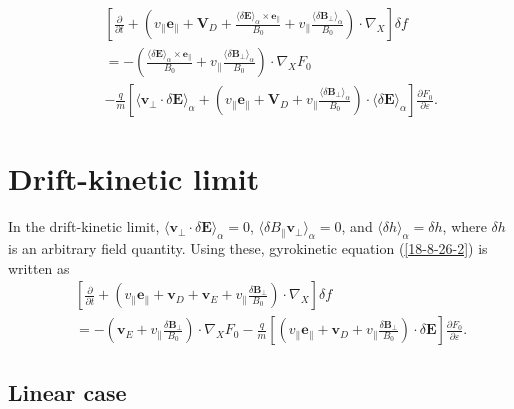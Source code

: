\documentclass{llncs}
\begin{document}
\begin{eqnarray}
  &  & \left[ \frac{\partial}{\partial t} + \left( v_{\parallel}
  \mathbf{e}_{\parallel} +\mathbf{V}_D + \frac{ \langle \delta \mathbf{E}
  \rangle_{\alpha} \times \mathbf{e}_{\parallel}}{B_0} + v_{\parallel}
  \frac{\langle \delta \mathbf{B}_{\perp} \rangle_{\alpha}}{B_0} \right) \cdot
  \nabla_X \right] \delta f \nonumber\\
  &  & = - \left( \frac{ \langle \delta \mathbf{E} \rangle_{\alpha} \times
  \mathbf{e}_{\parallel}}{B_0} + v_{\parallel} \frac{\langle \delta
  \mathbf{B}_{\perp} \rangle_{\alpha}}{B_0} \right) \cdot \nabla_X F_0
  \nonumber\\
  &  & - \frac{q}{m} \left[ \langle \mathbf{v}_{\perp} \cdot \delta
  \mathbf{E} \rangle_{\alpha} + \left( v_{\parallel} \mathbf{e}_{\parallel}
  +\mathbf{V}_D + v_{\parallel} \frac{\langle \delta \mathbf{B}_{\perp}
  \rangle_{\alpha}}{B_0} \right) \cdot \langle \delta \mathbf{E}
  \rangle_{\alpha} \right] \frac{\partial F_0}{\partial \varepsilon} . 
  \label{18-8-26-2}
\end{eqnarray}


\section{Drift-kinetic limit}

In the drift-kinetic limit, $\langle \mathbf{v}_{\perp} \cdot \delta
\mathbf{E} \rangle_{\alpha} = 0$, $\langle \delta B_{\parallel}
\mathbf{v}_{\perp} \rangle_{\alpha} = 0$, and $\langle \delta h
\rangle_{\alpha} = \delta h$, where $\delta h$ is an arbitrary field quantity.
Using these, gyrokinetic equation (\ref{18-8-26-2}) is written as
\begin{eqnarray}
  &  & \left[ \frac{\partial}{\partial t} + \left( v_{\parallel}
  \mathbf{e}_{\parallel} +\mathbf{v}_D +\mathbf{v}_E + v_{\parallel}
  \frac{\delta \mathbf{B}_{\perp}}{B_0} \right) \cdot \nabla_X \right] \delta
  f \nonumber\\
  &  & = - \left( \mathbf{v}_E + v_{\parallel} \frac{\delta
  \mathbf{B}_{\perp}}{B_0} \right) \cdot \nabla_X F_0 - \frac{q}{m} \left[
  \left( v_{\parallel} \mathbf{e}_{\parallel} +\mathbf{v}_D + v_{\parallel}
  \frac{\delta \mathbf{B}_{\perp}}{B_0} \right) \cdot \delta \mathbf{E}
  \right] \frac{\partial F_0}{\partial \varepsilon} .  \label{17-5-14-e1}
\end{eqnarray}

\subsection{Linear case}
\end{document}
